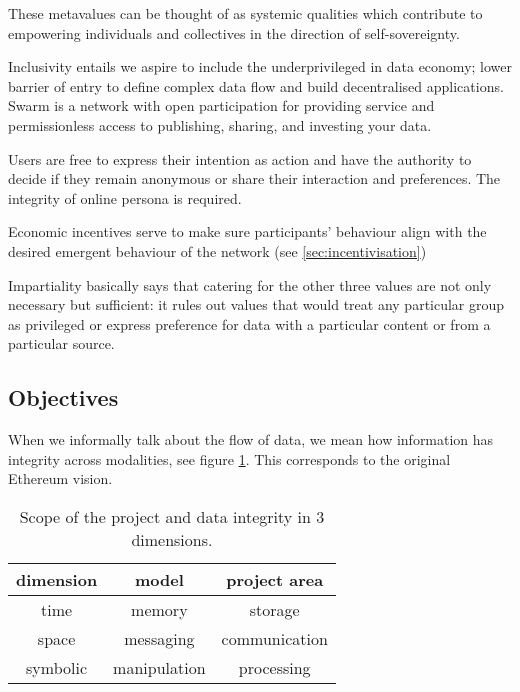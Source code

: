 These metavalues can be thought of as systemic qualities which contribute to empowering individuals and collectives in the direction of self-sovereignty.

Inclusivity entails we aspire to include the underprivileged in data economy; lower barrier of entry to define complex data flow and build decentralised applications. Swarm is a network with open participation for providing service and permissionless access to publishing, sharing, and investing your data.

Users are free to express their intention as action and have the authority to decide if they remain anonymous or share their interaction and preferences. The integrity of online persona is required. 

Economic incentives serve to make sure participants' behaviour align with the desired emergent behaviour of the network (see \ref{sec:incentivisation}) 

Impartiality basically says that catering for the other three values are not only necessary but sufficient: it rules out values that would treat any particular group as privileged or express preference for data with a particular content or from a particular source.

\subsection{Objectives}\label{sec:objectives}


When we informally talk about the flow of data, we mean how information has  integrity across modalities, see figure \ref{tab:scope}. This corresponds to the original Ethereum vision.

\begin{table}[]
\centering
\begin{tabular}{c|c|c}
dimension & model & project area\\\hline
%
time & memory & storage \\
space & messaging & communication \\
symbolic & manipulation & processing \\
\end{tabular}
\caption{Scope of the project and data integrity in 3 dimensions.}
\label{tab:scope}
\end{table}

